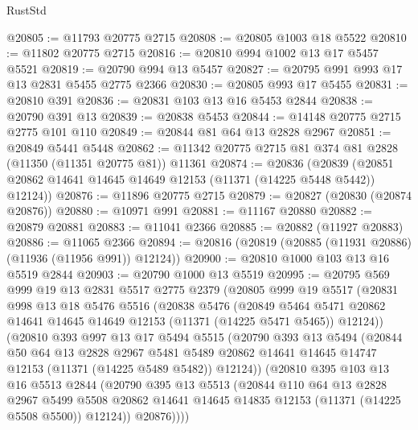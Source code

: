 \begin{lexlean}{RustStd}
\begin{coremodule}
@20805 := @11793 @20775 @2715
@20808 := @20805 @1003 @18 @5522
@20810 := @11802 @20775 @2715
@20816 := @20810 @994 @1002 @13 @17 @5457 @5521
@20819 := @20790 @994 @13 @5457
@20827 := @20795 @991 @993 @17 @13 @2831 @5455 @2775 @2366
@20830 := @20805 @993 @17 @5455
@20831 := @20810 @391
@20836 := @20831 @103 @13 @16 @5453 @2844
@20838 := @20790 @391 @13
@20839 := @20838 @5453
@20844 := @14148 @20775 @2715 @2775 @101 @110
@20849 := @20844 @81 @64 @13 @2828 @2967
@20851 := @20849 @5441 @5448
@20862 := @11342 @20775 @2715 @81 @374 @81 @2828 (@11350 (@11351 @20775 @81)) @11361
@20874 := @20836
    (@20839 (@20851 @20862 @14641 @14645 @14649 @12153 (@11371 (@14225 @5448 @5442)) @12124))
@20876 := @11896 @20775 @2715
@20879 := @20827 (@20830 (@20874 @20876))
@20880 := @10971 @991
@20881 := @11167 @20880
@20882 := @20879 @20881
@20883 := @11041 @2366
@20885 := @20882 (@11927 @20883)
@20886 := @11065 @2366
@20894 := @20816 (@20819 (@20885 (@11931 @20886) (@11936 (@11956 @991)) @12124))
@20900 := @20810 @1000 @103 @13 @16 @5519 @2844
@20903 := @20790 @1000 @13 @5519
@20995 := @20795
    @569
    @999
    @19
    @13
    @2831
    @5517
    @2775
    @2379
    (@20805
      @999
      @19
      @5517
      (@20831
        @998
        @13
        @18
        @5476
        @5516
        (@20838
          @5476
          (@20849
            @5464
            @5471
            @20862
            @14641
            @14645
            @14649
            @12153
            (@11371 (@14225 @5471 @5465))
            @12124))
        (@20810
          @393
          @997
          @13
          @17
          @5494
          @5515
          (@20790
            @393
            @13
            @5494
            (@20844
              @50
              @64
              @13
              @2828
              @2967
              @5481
              @5489
              @20862
              @14641
              @14645
              @14747
              @12153
              (@11371 (@14225 @5489 @5482))
              @12124))
          (@20810
            @395
            @103
            @13
            @16
            @5513
            @2844
            (@20790
              @395
              @13
              @5513
              (@20844
                @110
                @64
                @13
                @2828
                @2967
                @5499
                @5508
                @20862
                @14641
                @14645
                @14835
                @12153
                (@11371 (@14225 @5508 @5500))
                @12124))
            @20876))))

\end{coremodule}
\end{lexlean}
